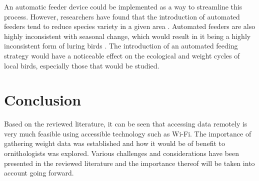 \documentclass[class=report,11pt,crop=false]{standalone}
\begin{document}
An automatic feeder device could be implemented as a way to streamline this process. However, researchers have found that the introduction of automated feeders tend to reduce species variety in a given area \cite{GalbraithFeeders}. Automated feeders are also highly inconsistent with seasonal change, which would result in it being a highly inconsistent form of luring birds \cite{GalbraithFeeders}. The introduction of an automated feeding strategy would have a noticeable effect on the ecological and weight cycles of local birds, especially those that would be studied.

\section{Conclusion}

Based on the reviewed literature, it can be seen that accessing data remotely is very much feasible using accessible technology such as Wi-Fi. The importance of gathering weight data was established and how it would be of benefit to ornithologists was explored. Various challenges and considerations have been presented in the reviewed literature and the importance thereof will be taken into account going forward. 

\ifstandalone

\printnoidxglossary[type=\acronymtype,nonumberlist]
\fi
\end{document}
